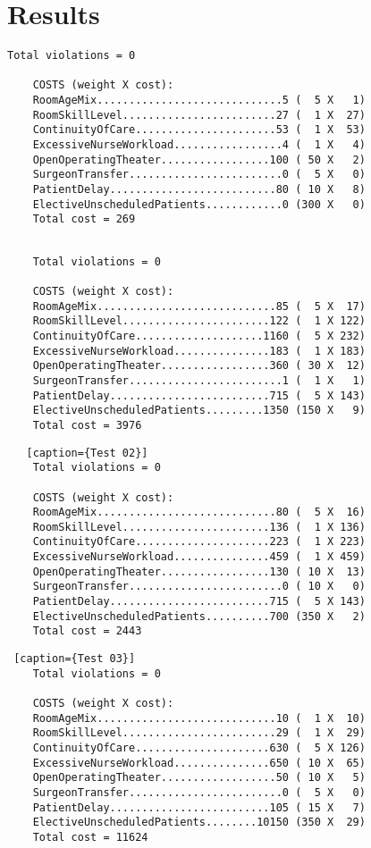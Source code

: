 \appendix

\section{Results}
\begin{lstlisting}[caption={Toy}]
    Total violations = 0

    COSTS (weight X cost): 
    RoomAgeMix.............................5 (  5 X   1)
    RoomSkillLevel........................27 (  1 X  27)
    ContinuityOfCare......................53 (  1 X  53)
    ExcessiveNurseWorkload.................4 (  1 X   4)
    OpenOperatingTheater.................100 ( 50 X   2)
    SurgeonTransfer........................0 (  5 X   0)
    PatientDelay..........................80 ( 10 X   8)
    ElectiveUnscheduledPatients............0 (300 X   0)
    Total cost = 269
\end{lstlisting}
\begin{lstlisting}[caption={Test 01}]

    Total violations = 0
    
    COSTS (weight X cost): 
    RoomAgeMix............................85 (  5 X  17)
    RoomSkillLevel.......................122 (  1 X 122)
    ContinuityOfCare....................1160 (  5 X 232)
    ExcessiveNurseWorkload...............183 (  1 X 183)
    OpenOperatingTheater.................360 ( 30 X  12)
    SurgeonTransfer........................1 (  1 X   1)
    PatientDelay.........................715 (  5 X 143)
    ElectiveUnscheduledPatients.........1350 (150 X   9)
    Total cost = 3976
\end{lstlisting}
\begin{lstlisting}   [caption={Test 02}]
    Total violations = 0
    
    COSTS (weight X cost): 
    RoomAgeMix............................80 (  5 X  16)
    RoomSkillLevel.......................136 (  1 X 136)
    ContinuityOfCare.....................223 (  1 X 223)
    ExcessiveNurseWorkload...............459 (  1 X 459)
    OpenOperatingTheater.................130 ( 10 X  13)
    SurgeonTransfer........................0 ( 10 X   0)
    PatientDelay.........................715 (  5 X 143)
    ElectiveUnscheduledPatients..........700 (350 X   2)
    Total cost = 2443
\end{lstlisting}
\begin{lstlisting} [caption={Test 03}]
    Total violations = 0
    
    COSTS (weight X cost): 
    RoomAgeMix............................10 (  1 X  10)
    RoomSkillLevel........................29 (  1 X  29)
    ContinuityOfCare.....................630 (  5 X 126)
    ExcessiveNurseWorkload...............650 ( 10 X  65)
    OpenOperatingTheater..................50 ( 10 X   5)
    SurgeonTransfer........................0 (  5 X   0)
    PatientDelay.........................105 ( 15 X   7)
    ElectiveUnscheduledPatients........10150 (350 X  29)
    Total cost = 11624
\end{lstlisting}
